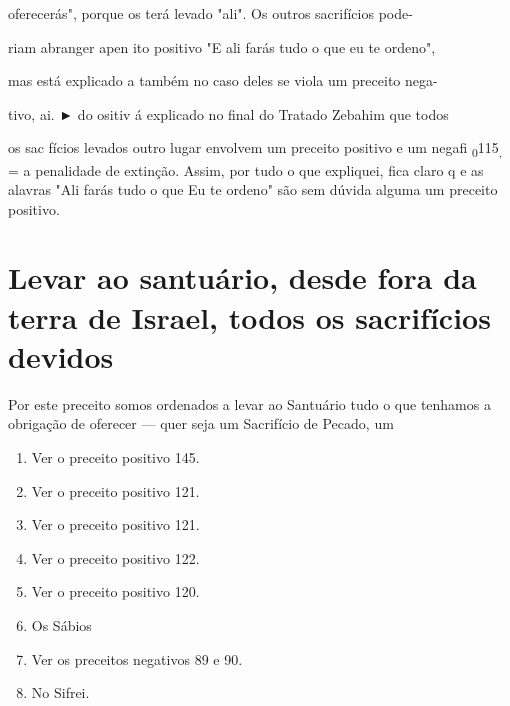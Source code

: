 \begin{itemize}
\begin{enumrate}
\begin{itemize}
\begin{itemize}
oferecerás", porque os terá levado "ali". Os outros sacrifícios pode-

riam abranger apen ito positivo "E ali farás tudo o que eu te ordeno",

mas está explicado a também no caso deles se viola um preceito nega-

tivo, ai. ► do ositiv á explicado no final do Tratado
Zebahim que todos

os sac fícios levados outro lugar envolvem um preceito positivo e um
negafi \textsubscript{0}115\textsubscript{,} = a penalidade de extinção.
Assim, por tudo o que expliquei, fica claro q e as alavras "Ali farás
tudo o que Eu te ordeno" são sem dúvida algu­ma um preceito positivo.

\section{Levar ao santuário, desde fora da terra de Israel, todos os sacrifícios devidos}

Por este preceito somos ordenados a levar ao Santuário tudo o que
tenhamos a obrigação de oferecer --- quer seja um Sacrifício de Pecado,
um


\begin{enumerate}
\def\labelenumi{\arabic{enumi}.}
\setcounter{enumi}{108}
\item
 
 Ver o preceito positivo 145.
 
\item
 
 Ver o preceito positivo 121.
 
\item
 
 Ver o preceito positivo 121.
 
\item
 
 Ver o preceito positivo 122.
 
\item
 
 Ver o preceito positivo 120.
 
\item
 
 Os Sábios
 
\item
 
 Ver os preceitos negativos 89 e 90.
 
\item
 
 No Sifrei.
 

\end{enumerate}
\end{itemize}
\end{itemize}
\end{enumrate}
\end{itemize}
